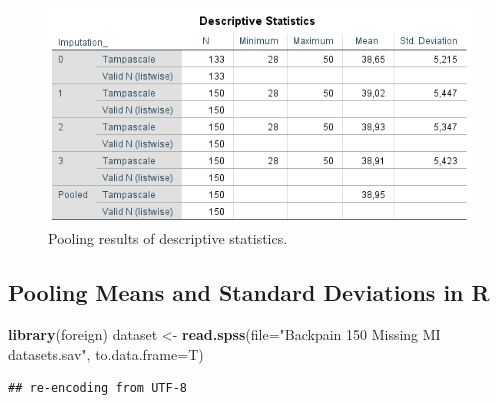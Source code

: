 \documentclass[]{book}
\newenvironment{Shaded}{\begin{snugshade}}{\end{snugshade}}
\newcommand{\KeywordTok}[1]{\textcolor[rgb]{0.13,0.29,0.53}{\textbf{#1}}}
\newcommand{\DataTypeTok}[1]{\textcolor[rgb]{0.13,0.29,0.53}{#1}}
\newcommand{\StringTok}[1]{\textcolor[rgb]{0.31,0.60,0.02}{#1}}
\newcommand{\NormalTok}[1]{#1}
\theoremstyle{definition}
\theoremstyle{definition}
\theoremstyle{definition}
\theoremstyle{remark}
\begin{document}
\begin{figure}

{\centering \includegraphics[width=0.9\linewidth]{images/table5.3} 

}

\caption{Pooling results of descriptive statistics.}\label{fig:tab5-3}
\end{figure}

\subsection{Pooling Means and Standard Deviations in
R}\label{pooling-means-and-standard-deviations-in-r}

\begin{Shaded}
\begin{Highlighting}[]
\KeywordTok{library}\NormalTok{(foreign)}
\NormalTok{dataset <-}\StringTok{ }\KeywordTok{read.spss}\NormalTok{(}\DataTypeTok{file=}\StringTok{"Backpain 150 Missing MI datasets.sav"}\NormalTok{, }\DataTypeTok{to.data.frame=}\NormalTok{T)}
\end{Highlighting}
\end{Shaded}

\begin{verbatim}
## re-encoding from UTF-8
\end{verbatim}
\end{document}
